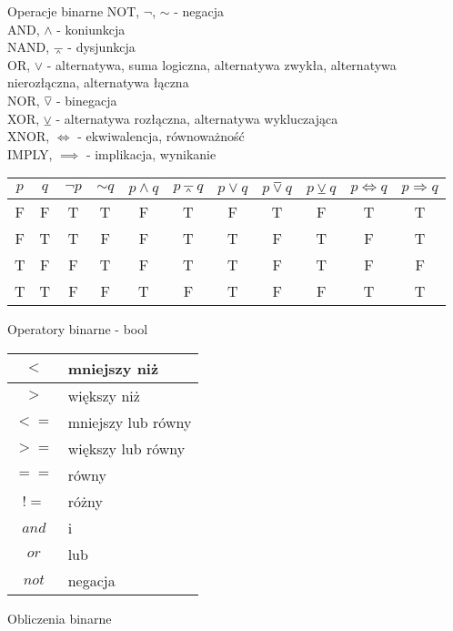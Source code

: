 \begin{frame}{Operacje binarne}
    NOT, $\lnot$, $\sim$ - negacja \\
    AND, $\land$ - koniunkcja \\
    NAND, $\barwedge$ - dysjunkcja \\
    OR, $\lor$ - alternatywa, suma logiczna, alternatywa zwykła, alternatywa nierozłączna, alternatywa łączna \\
    NOR, $\barvee$ - binegacja \\
    XOR, $\veebar$ - alternatywa rozłączna, alternatywa wykluczająca \\
    XNOR, $\iff$ - ekwiwalencja, równoważność \\
    IMPLY, $\implies$ - implikacja, wynikanie \\
    \scriptsize{
    \begin{table}
        \centering
        \begin{tabular}{|c|c||c|c||c|c||c|c||c|c||c|}
            \hline
            $p$ & $q$ & $\lnot p$ & $\sim q$ & $p \land q$ & $p \barwedge q$ & $p \lor q$ & $p \barvee q$ & $p \veebar q$ & $p \Leftrightarrow q$ & $p \Rightarrow q$ \\
            \hline
            F & F & T & T & F & T & F & T & F & T & T \\
            \hline
            F & T & T & F & F & T & T & F & T & F & T \\
            \hline
            T & F & F & T & F & T & T & F & T & F & F \\
            \hline
            T & T & F & F & T & F & T & F & F & T & T \\
            \hline
        \end{tabular}
    \end{table}
    }
\end{frame}

\begin{frame}{Operatory binarne - bool}
    \begin{table}
        \centering
        \begin{tabular}{|c|l|}
            \hline
            $<$ & mniejszy niż \\
            \hline
            $>$ & większy niż \\
            \hline
            $<=$ & mniejszy lub równy \\
            \hline
            $>=$ & większy lub równy \\
            \hline
            $==$ & równy \\
            \hline
            $!=$ & różny \\
            \hline
            $and$ & i \\
            \hline
            $or$ & lub \\
            \hline
            $not$ & negacja \\
            \hline
        \end{tabular}
    \end{table}
\end{frame}

\begin{frame}{Obliczenia binarne}
    
\end{frame}
